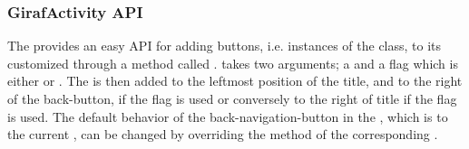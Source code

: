 
\subsubsection{GirafActivity API}

The  provides an easy API for adding \giraf buttons, i.e. instances of the  class, to its customized  through a method called .  takes two arguments; a  and a flag which is either  or . The  is then added to the leftmost position of the title, and to the right of the back-button, if the  flag is used or conversely to the right of title if the  flag is used. 
The default behavior of the back-navigation-button in the , which is to  the current , can be changed by overriding the  method of the corresponding .          
